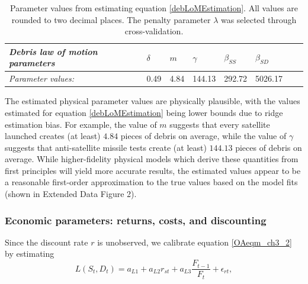 \documentclass[9pt,twoside,lineno]{pnas-new}
\begin{document}
\begin{table}[H]
	\centering
	\begin{tabular}{|l|l|l|l|l|l|l|l|}
		\hline
		\textit{Debris law of motion parameters} & \textbf{$\delta$} & \textbf{$m$} & \textbf{$\gamma$} & \textbf{$\beta_{SS}$} & \textbf{$\beta_{SD}$} \\ \hline
		\textit{Parameter values:}                           & 0.49                & 4.84         & 144.13              & 292.72                & 5026.17                          \\ \hline
	\end{tabular}
	\caption[Parameter values from estimating equation \ref{debLoMEstimation}]{Parameter values from estimating equation \ref{debLoMEstimation}. All values are rounded to two decimal places. The penalty parameter $\lambda$ was selected through cross-validation.}
	\label{debParms}
\end{table}

The estimated physical parameter values are physically plausible, with the values estimated for equation \ref{debLoMEstimation} being lower bounds due to ridge estimation bias. For example, the value of $m$ suggests that every satellite launched creates (at least) $4.84$ pieces of debris on average, while the value of $\gamma$ suggests that anti-satellite missile tests create (at least) $144.13$ pieces of debris on average. While higher-fidelity physical models which derive these quantities from first principles will yield more accurate results, the estimated values appear to be a reasonable first-order approximation to the true values based on the model fits (shown in Extended Data Figure 2).

\subsubsection{Economic parameters: returns, costs, and discounting}
\label{economicCalibrationSection}
Since the discount rate $r$ is unobserved, we calibrate equation \ref{OAeqm_ch3_2} by estimating
\begin{equation}
\label{empiricalEqn}
L(S_{t},D_{t}) = a_{L 1} + a_{L 2} r_{st} + a_{L 3} \frac{F_{t-1}}{F_t} + \epsilon_{r t},
\end{equation}
\end{document}
